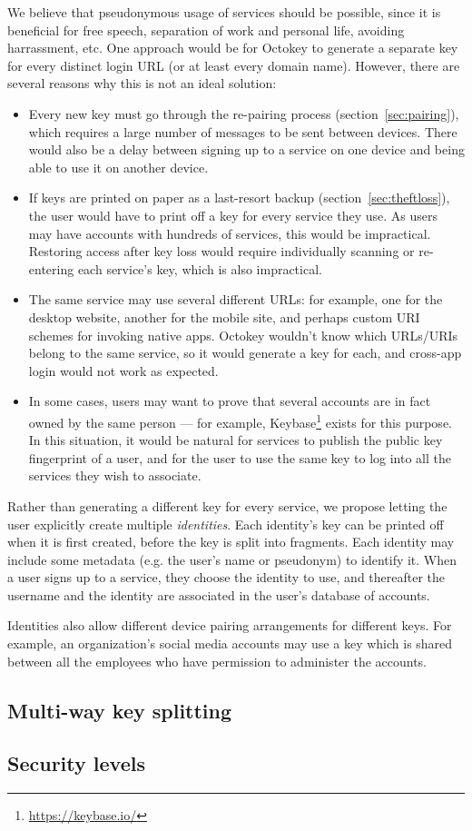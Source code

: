 We believe that pseudonymous usage of services should be possible, since it is beneficial for free
speech, separation of work and personal life, avoiding harrassment, etc. One approach would be for
Octokey to generate a separate key for every distinct login URL (or at least every domain name).
However, there are several reasons why this is not an ideal solution:
\begin{itemize}
\item Every new key must go through the re-pairing process (section~\ref{sec:pairing}), which
requires a large number of messages to be sent between devices. There would also be a delay between
signing up to a service on one device and being able to use it on another device.
\item If keys are printed on paper as a last-resort backup (section~\ref{sec:theftloss}), the user
would have to print off a key for every service they use. As users may have accounts with hundreds
of services, this would be impractical. Restoring access after key loss would require individually
scanning or re-entering each service's key, which is also impractical.
\item The same service may use several different URLs: for example, one for the desktop website,
another for the mobile site, and perhaps custom URI schemes for invoking native apps. Octokey
wouldn't know which URLs/URIs belong to the same service, so it would generate a key for each, and
cross-app login would not work as expected.
\item In some cases, users may want to prove that several accounts are in fact owned by the same
person --- for example, Keybase\footnote{\url{https://keybase.io/}} exists for this purpose. In this
situation, it would be natural for services to publish the public key fingerprint of a user, and for
the user to use the same key to log into all the services they wish to associate.
\end{itemize}

Rather than generating a different key for every service, we propose letting the user explicitly
create multiple \emph{identities}. Each identity's key can be printed off when it is first created,
before the key is split into fragments. Each identity may include some metadata (e.g. the user's
name or pseudonym) to identify it. When a user signs up to a service, they choose the identity to
use, and thereafter the username and the identity are associated in the user's database of accounts.

Identities also allow different device pairing arrangements for different keys. For example, an
organization's social media accounts may use a key which is shared between all the employees who
have permission to administer the accounts.

\subsection{Multi-way key splitting}
\subsection{Security levels}

